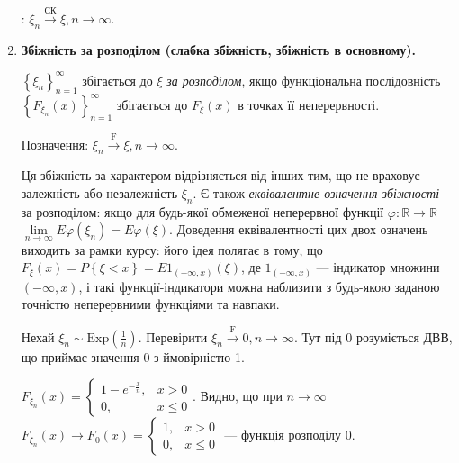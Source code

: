 \begin{enumerate}
    : $\xi_n \overset{\text{СК}}{\longrightarrow} \xi, n \to \infty$.
    \item \textbf{Збіжність за розподілом (слабка збіжність, збіжність в основному).}

    \noindent$\left\{ \xi_n\right\}_{n=1}^{\infty}$ збігається до $\xi$ \emph{за розподілом}, якщо функціональна послідовність
    $\left\{ F_{\xi_n} (x)\right\}_{n=1}^{\infty}$ збігається до $F_{\xi}(x)$ в точках її неперервності.

    Позначення: $\xi_n \overset{\mathrm{F}}{\longrightarrow} \xi, n \to \infty$.

    Ця збіжність за характером відрізняється від інших тим, що не враховує залежність або незалежність $\xi_n$.
    Є також \emph{еквівалентне означення збіжності} за розподілом: якщо для будь-якої обмеженої неперервної функції $\varphi : \mathbb{R} \to \mathbb{R}$
    $\underset{n \to \infty}{\lim} E \varphi(\xi_n) = E\varphi(\xi)$.
    Доведення еквівалентності цих двох означень виходить за рамки курсу: його ідея полягає в тому, що $F_{\xi}(x) = P\left\{ \xi < x\right\} = E 1_{(-\infty, x)}(\xi)$,
    де $1_{(-\infty, x)}$ --- індикатор множини $(-\infty, x)$, і такі функції-індикатори можна наблизити з будь-якою заданою точністю неперервними функціями та навпаки.
    \begin{example}
        Нехай $\xi_n \sim \mathrm{Exp}(\frac{1}{n})$. Перевірити $\xi_n \overset{\mathrm{F}}{\to} 0, n \to \infty$.
        Тут під 0 розуміється ДВВ, що приймає значення 0 з ймовірністю 1.

        $F_{\xi_n}(x) = \begin{cases}
            1 - e^{-\frac{x}{n}}, & x > 0 \\
            0, & x \leq 0
        \end{cases}$. Видно, що при $n \to \infty$ $F_{\xi_n}(x) \to F_0(x) = \begin{cases}
            1, & x > 0 \\
            0, & x \leq 0
        \end{cases}
        $ --- функція розподілу 0.
    \end{example}
\end{enumerate}

